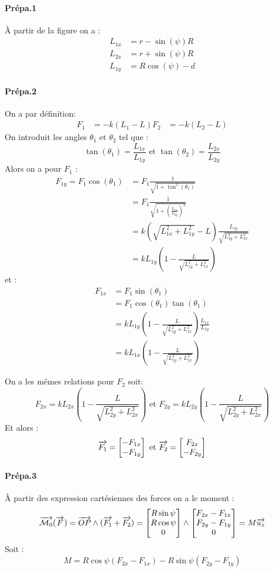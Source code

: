 \documentclass[10pt,a4paper,notitlepage]{article}
\renewcommand{\vec}{\overrightarrow}
\begin{document}
\paragraph{Prépa.1}
À partir de la figure on a :
\begin{align*}
  L_{1x} &= r - \sin(\psi)R \\
  L_{2x} &= r + \sin(\psi)R \\
  L_{1y} &= R\cos(\psi) - d
\end{align*}

\paragraph{Prépa.2} On a par définition:
\begin{align*}
  F_1 &= -k (L_1-L)
  F_2 &= -k (L_2-L)
\end{align*}
On introduit les angles $\theta_1$ et $\theta_2$ tel que :
 \[
   \tan(\theta_1)  =\frac{L_{1x}}{L_{1y}} \text{ et } \tan(\theta_2) =\frac{L_{2x}}{L_{2y}}
 \]
 Alors on a  pour $F_1$ :
 \begin{align*}
   F_{1y} = F_1 \cos(\theta_1) &= F_1 \frac{1}{\sqrt{1+\tan^2(\theta_1)}}\\
                          &= F_1 \frac{1}{\sqrt{1+\left(\frac{L_{1x}}{L_{2y}}\right)^2}} \\
                          &= k\left(\sqrt{L_{1x}^2+L_{1y}^2}-L\right) \frac{L_{1y}}{\sqrt{L_{1y}^2+L_{1x}^2}}\\
                          &= k L_{1y} \left(1- \frac{L}{\sqrt{L_{1y}^2+L_{1x}^2}}\right)
 \end{align*}
 et :
 \begin{align*}
   F_{1x} &= F_1 \sin(\theta_1)\\
          &= F_1 \cos(\theta_1)\tan(\theta_1) \\
          &= k L_{1y} \left(1- \frac{L}{\sqrt{L_{1y}^2+L_{1x}^2}}\right) \frac{L_{1x}}{L_{1y}} \\
          &= k L_{1x} \left(1- \frac{L}{\sqrt{L_{1y}^2+L_{1x}^2}}\right)
 \end{align*}

 On a les mêmes relations pour $F_2$ soit:
 \[
   F_{2x} = k L_{2x} \left(1- \frac{L}{\sqrt{L_{2y}^2+L_{2x}^2}}\right) \text{ et }
   F_{2y} = k L_{2y} \left(1- \frac{L}{\sqrt{L_{2y}^2+L_{2x}^2}}\right)
 \]
 Et alors :
 \[
\vec{F_1} = \vect{-F_{1x} \\-F_{1y}} \text{ et } \vec{F_2} = \vect{F_{2x}\\-F_{2y}}
 \]
 \paragraph{Prépa.3}
 À partir des expression cartésiennes des forces on a le moment :
 \[
   \vec{\mathcal{M}_{0}}(\vec{F}) =\vec{OP}\wedge (\vec{F_1} + \vec{F_2})=
   \vect{R\sin\psi \\ R\cos\psi \\0} \wedge \vect{F_{2x}-F_{1x}\\ F_{2y}-F_{1y}\\0} = M \vec{u_z}
 \]
 Soit :
 \[
   M = R\cos\psi(F_{2x}-F_{1x}) -R\sin\psi(F_{2y}-F_{1y})
 \]
\end{document}
